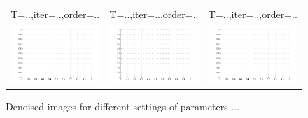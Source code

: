 \documentclass{article}
\begin{document}
\begin{figure}
\begin{tabular}{ccc}
T=..,iter=..,order=.. & T=..,iter=..,order=.. & T=..,iter=..,order=..\\
\includegraphics[scale=0.25]{emptiness.pdf}
&

\includegraphics[scale=0.25]{emptiness.pdf}

&

\includegraphics[scale=0.25]{emptiness.pdf}
\end{tabular}
\caption{Denoised images for different settings of parameters ...}
\end{figure}
\end{document}
